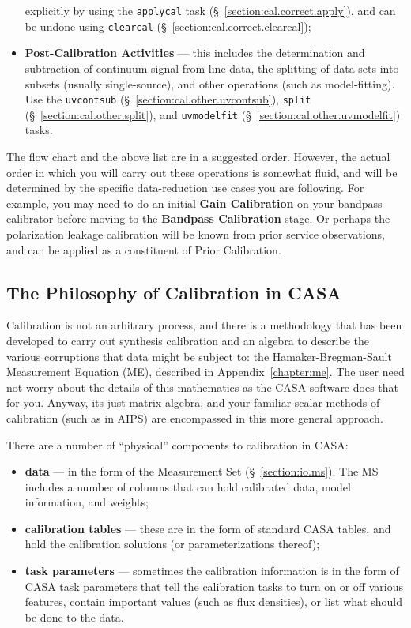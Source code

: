 \begin{itemize}
      explicitly by using the {\tt applycal} task
      (\S~\ref{section:cal.correct.apply}), and can be undone using
      {\tt clearcal} (\S~\ref{section:cal.correct.clearcal});
   \item {\bf Post-Calibration Activities} --- this includes the
      determination and subtraction of continuum signal from line
      data, the splitting of data-sets into subsets (usually
      single-source), and other operations (such as model-fitting).
      Use the {\tt uvcontsub} (\S~\ref{section:cal.other.uvcontsub}),
      {\tt split} (\S~\ref{section:cal.other.split}),
      and {\tt uvmodelfit} (\S~\ref{section:cal.other.uvmodelfit})
      tasks.
\end{itemize}

The flow chart and the above list are in a suggested order.  However,
the actual order in which you will carry out these operations is
somewhat fluid, and will be determined by the specific data-reduction
use cases you are following.  For example, you may need to do an
initial {\bf Gain Calibration} on your bandpass calibrator before
moving to the {\bf Bandpass Calibration} stage.  Or perhaps the
polarization leakage calibration will be known from prior service 
observations, and can be applied as a constituent of Prior Calibration.

\subsection{The Philosophy of Calibration in CASA}
\label{section:cal.flow.philo}

Calibration is not an arbitrary process, and there is
a methodology that has been developed to carry out synthesis
calibration and an algebra to describe the various corruptions
that data might be subject to: the Hamaker-Bregman-Sault Measurement
Equation (ME), described in Appendix~\ref{chapter:me}.
The user need not worry about the details of this mathematics
as the CASA software does that for you.  Anyway, its just
matrix algebra, and your familiar scalar methods of calibration
(such as in AIPS) are encompassed in this more general approach.

There are a number of ``physical'' components to calibration in CASA:
\begin{itemize}
   \item {\bf data} --- in the form of the Measurement Set
      (\S~\ref{section:io.ms}).  The MS includes a number of
      columns that can hold calibrated data, model information,
      and weights;
   \item {\bf calibration tables} --- these are in the form of
      standard CASA tables, and hold the calibration solutions
      (or parameterizations thereof);
   \item {\bf task parameters} --- sometimes the calibration
      information is in the form of CASA task parameters that
      tell the calibration tasks to turn on or off various
      features, contain important values (such as flux densities),
      or list what should be done to the data.
\end{itemize}

